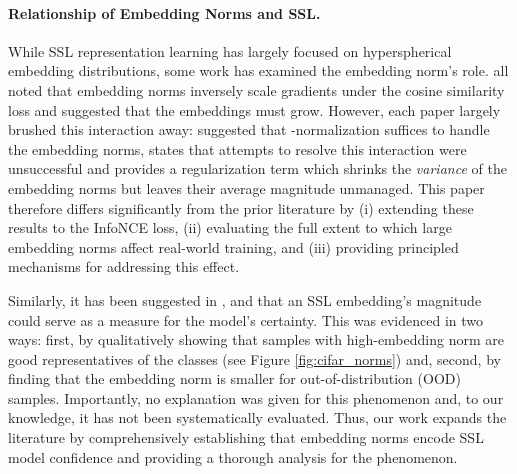 \paragraph{Relationship of Embedding Norms and SSL.}
While SSL representation learning has largely focused on hyperspherical embedding distributions, some work has examined the embedding norm's role. \citet{normface, mentions_catch22, spherical_embeddings} all noted that embedding norms inversely scale gradients under the cosine similarity loss and suggested that the embeddings must grow. However, each paper largely brushed this interaction away: \citet{normface} suggested that \ltwo-normalization suffices to handle the embedding norms, \citet{mentions_catch22} states that attempts to resolve this interaction were unsuccessful and \citet{spherical_embeddings} provides a regularization term which shrinks the \emph{variance} of the embedding norms but leaves their average magnitude unmanaged. This paper therefore differs significantly from the prior literature by (i) extending these results to the InfoNCE loss, (ii) evaluating the full extent to which large embedding norms affect real-world training, and (iii) providing principled mechanisms for addressing this effect.

Similarly, it has been suggested in \citet{embed_norm_confidence_1}, \citet{embed_norm_confidence_2} and \citet{embed_norm_confidence_3} that an SSL embedding's magnitude could serve as a measure for the model's certainty. This was evidenced in two ways: first, by qualitatively showing that samples with high-embedding norm are good representatives of the classes (see Figure \ref{fig:cifar_norms}) and, second, by finding that the embedding norm is smaller for out-of-distribution (OOD) samples. Importantly, no explanation was given for this phenomenon and, to our knowledge, it has not been systematically evaluated. Thus, our work expands the literature by comprehensively establishing that embedding norms encode SSL model confidence and providing a thorough analysis for the phenomenon.